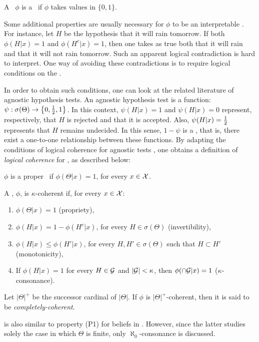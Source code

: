 \begin{definition}
 A \summ\ $\phi$ is a 
 \stdsumm\ if $\phi$ takes values in $\{0,1\}$.
\end{definition}

Some additional properties are usually 
necessary for $\phi$ to be 
an interpretable \summ.
For instance, let $H$ be the hypothesis that 
it will rain tomorrow.
If both $\phi(H|x) = 1$ and $\phi(H^c|x) = 1$, then
one takes as true both
that it will rain and 
that it will not rain tomorrow.
Such an apparent logical contradiction is
hard to interpret.
One way of avoiding these
contradictions is
to require logical conditions on
the \summ.

In order to obtain such conditions,
one can look at the related literature of
agnostic hypothesis tests.
An agnostic hypothesis test is a function:
$\psi: \sigma(\Theta) 
\rightarrow \left\{0,\frac{1}{2},1\right\}$.
In this context, 
$\psi(H|x) = 1$ and $\psi(H|x) = 0$ represent,
respectively, that
$H$ is rejected and that it is accepted.
Also, $\psi(H|x) = \frac{1}{2}$ represents that
$H$ remains undecided.
In this sense, $1-\psi$ is
a \summ, that is,
there exist a one-to-one relationship
between these functions.
By adapting the conditions of logical coherence
for agnostic tests \citep{Esteves2016},
one obtains a definition of 
\textit{logical coherence}
for \summs, as described below:

\begin{definition}
 \label{def:proper}
 $\phi$ is a proper \summ \
 if $\phi(\Theta|x) = 1$,
 for every $x \in \mathcal{X}$.
\end{definition}

\begin{definition}
 \label{def:coherence}
 A \summ, $\phi$, is 
 $\kappa$-coherent if, 
 for every $x \in \mathcal{X}$:
 \begin{enumerate}
  \item $\phi(\Theta|x) = 1$ (propriety),
  \item $\phi(H|x) = 1 - \phi(H^c|x)$,
  for every $H \in \sigma(\Theta)$ (invertibility),
  \item $\phi(H|x) \leq \phi(H'|x)$,
  for every $H, H' \in \sigma(\Theta)$
  such that $H \subset H'$ (monotonicity),
  \item If $\phi(H|x) = 1$ for every $H \in \mathcal{G}$
  and $|\mathcal{G}| < \kappa$, then $\phi(\cap\mathcal{G}|x) = 1$
  ($\kappa$-consonance).
 \end{enumerate}
 Let $|\Theta|^{+}$ be 
 the successor cardinal of $|\Theta|$.
 If $\phi$ is $|\Theta|^{+}$-coherent,
 then it is said to be
 \textit{completely-coherent}.
\end{definition}
 is also similar to 
property (P1) for beliefs in \citet{Leitgeb2013}.
However, since the latter studies solely
the case in which $\Theta$ is finite,
only $\aleph_0$-consonance is discussed.

